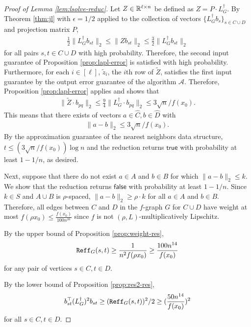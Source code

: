 \begin{proof}[Proof of Lemma \ref{lem:lsolve-reduc}]
Let $Z \in {\mathbb R}^{\ell \times n}$ be defined as $Z = P \cdot L_G^{\dagger}$. By Theorem \ref{thm:jl} with $\epsilon = 1/2$ applied to the collection of vectors $\{L_G^{\dagger} b_s\}_{s\in C\cup D}$ and projection matrix $P$, 
\begin{align*}
\frac{1}{2} \|L_G^{\dagger}b_{st}\|_2 \le \|Z b_{st}\|_2 \le \frac{3}{2} \|L_G^{\dagger}b_{st}\|_2
\end{align*}
for all pairs $s,t\in C\cup D$ with high probability. Therefore, the second input guarantee of Proposition \ref{prop:lapl-error} is satisfied with high probability. Furthermore, for each $i\in [\ell]$, $\tilde{z}_i$, the $i$th row of $\tilde{Z}$, satisfies the first input guarantee by the output error guarantee of the algorithm $\mathcal A$. Therefore, Proposition \ref{prop:lapl-error} applies and shows that
\begin{align*}
\|\tilde{Z} \cdot b_{pq}\|_2 \le \frac{9}{4} \|L_G^{\dagger} \cdot b_{pq}\|_2 \le 3\sqrt{n} / f(x_0).
\end{align*}
This means that there exists of vectors $a\in \widehat{C},b\in \widehat{D}$ with 
\begin{align*}
\|a - b\|_2 \le 3\sqrt{n} / f(x_0).
\end{align*}
By the approximation guarantee of the nearest neighbors data structure, $t \le ( 3\sqrt{n} / f(x_0) )\log n $ and the reduction returns $\mathsf{true}$ with probability at least $1 - 1/n$, as desired.

Next, suppose that there do not exist $a\in A$ and $b\in B$ for which $\|a - b\|_2 \le k$. We show that the reduction returns $\mathsf{false}$ with probability at least $1 - 1/n$. Since $k\in S$ and $A\cup B$ is $\rho$-spaced, $\|a - b\|_2 \ge \rho \cdot k$ for all $a\in A$ and $b\in B$. Therefore, all edges between $C$ and $D$ in the $f$-graph $G$ for $C\cup D$ have weight at most $f(\rho x_0)\le \frac{f(x_0)}{100 n^{16}}$ since $f$ is not $(\rho,L)$-multiplicatively Lipschitz. 

By the upper bound of Proposition \ref{prop:weight-res}, 
\begin{align*}
\mathtt{Reff}_G(s,t) \ge \frac{1}{ n^2 f(\rho x_0) }\ge \frac{ 100 n^{14} }{f(x_0)}
\end{align*}
for any pair of vertices $s\in C, t\in D$. 

By the lower bound of Proposition \ref{prop:res2-res}, 
\begin{align*}
b_{st}^\top (L_G^{\dagger})^2 b_{st} \ge (\mathtt{Reff}_G(s,t))^2/2 \ge (\frac{50n^{14}}{f(x_0)})^2
\end{align*}
for all $s\in C, t\in D$. 



\end{proof}
